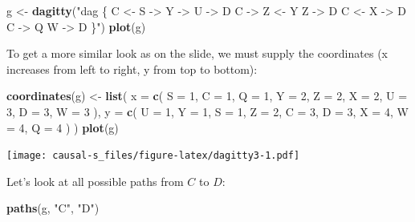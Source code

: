 \documentclass[
]{book}
\newenvironment{Shaded}{\begin{snugshade}}{\end{snugshade}}
\newcommand{\AttributeTok}[1]{\textcolor[rgb]{0.13,0.29,0.53}{#1}}
\newcommand{\DecValTok}[1]{\textcolor[rgb]{0.00,0.00,0.81}{#1}}
\newcommand{\FunctionTok}[1]{\textcolor[rgb]{0.13,0.29,0.53}{\textbf{#1}}}
\newcommand{\NormalTok}[1]{#1}
\newcommand{\OtherTok}[1]{\textcolor[rgb]{0.56,0.35,0.01}{#1}}
\newcommand{\StringTok}[1]{\textcolor[rgb]{0.31,0.60,0.02}{#1}}
\begin{document}
\begin{Shaded}
\begin{Highlighting}[]
\NormalTok{g }\OtherTok{\textless{}{-}} \FunctionTok{dagitty}\NormalTok{(}\StringTok{"dag \{}
\StringTok{    C \textless{}{-} S {-}\textgreater{} Y {-}\textgreater{} U {-}\textgreater{} D}
\StringTok{    C {-}\textgreater{} Z \textless{}{-} Y}
\StringTok{    Z {-}\textgreater{} D}
\StringTok{    C \textless{}{-} X {-}\textgreater{} D}
\StringTok{    C {-}\textgreater{} Q}
\StringTok{    W {-}\textgreater{} D}
\StringTok{  \}"}\NormalTok{)}
\FunctionTok{plot}\NormalTok{(g)}
\end{Highlighting}
\end{Shaded}

To get a more similar look as on the slide, we must supply the coordinates (x increases from left to right, y from top to bottom):

\begin{Shaded}
\begin{Highlighting}[]
\FunctionTok{coordinates}\NormalTok{(g) }\OtherTok{\textless{}{-}} 
  \FunctionTok{list}\NormalTok{(}
    \AttributeTok{x =} 
      \FunctionTok{c}\NormalTok{(}
        \AttributeTok{S =} \DecValTok{1}\NormalTok{, }\AttributeTok{C =} \DecValTok{1}\NormalTok{, }\AttributeTok{Q =} \DecValTok{1}\NormalTok{, }\AttributeTok{Y =} \DecValTok{2}\NormalTok{, }\AttributeTok{Z =} \DecValTok{2}\NormalTok{, }
        \AttributeTok{X =} \DecValTok{2}\NormalTok{, }\AttributeTok{U =} \DecValTok{3}\NormalTok{, }\AttributeTok{D =} \DecValTok{3}\NormalTok{, }\AttributeTok{W =} \DecValTok{3}
\NormalTok{      ),}
    \AttributeTok{y =} 
      \FunctionTok{c}\NormalTok{(}
        \AttributeTok{U =} \DecValTok{1}\NormalTok{, }\AttributeTok{Y =} \DecValTok{1}\NormalTok{, }\AttributeTok{S =} \DecValTok{1}\NormalTok{, }\AttributeTok{Z =} \DecValTok{2}\NormalTok{, }\AttributeTok{C =} \DecValTok{3}\NormalTok{, }
        \AttributeTok{D =} \DecValTok{3}\NormalTok{, }\AttributeTok{X =} \DecValTok{4}\NormalTok{, }\AttributeTok{W =} \DecValTok{4}\NormalTok{, }\AttributeTok{Q =} \DecValTok{4}
\NormalTok{      )}
\NormalTok{  )}
\FunctionTok{plot}\NormalTok{(g)}
\end{Highlighting}
\end{Shaded}

\texttt{[image: causal-s\_files/figure-latex/dagitty3-1.pdf]}

Let's look at all possible paths from \(C\) to \(D\):

\begin{Shaded}
\begin{Highlighting}[]
\FunctionTok{paths}\NormalTok{(g, }\StringTok{"C"}\NormalTok{, }\StringTok{"D"}\NormalTok{)}
\end{Highlighting}
\end{Shaded}
\end{document}
